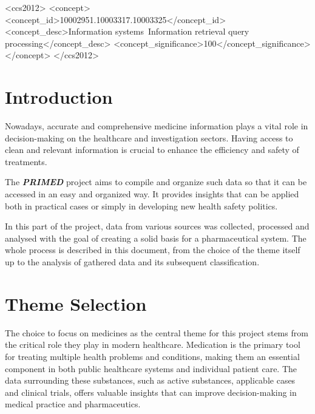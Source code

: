 \documentclass[sigconf]{acmart}
\begin{document}
\begin{CCSXML}
<ccs2012>
   <concept>
       <concept_id>10002951.10003317.10003325</concept_id>
       <concept_desc>Information systems~Information retrieval query processing</concept_desc>
       <concept_significance>100</concept_significance>
       </concept>
 </ccs2012>
\end{CCSXML}



\maketitle

\section{Introduction}
Nowadays, accurate and comprehensive medicine information plays a vital role in decision-making on the healthcare and investigation sectors. Having access to clean and relevant information is crucial to enhance the efficiency and safety of treatments.

The \textit{\textbf{PRIMED}} project aims to compile and organize such data so that it can be accessed in an easy and organized way. It provides insights that can be applied both in practical cases or simply in developing new health safety politics.

In this part of the project, data from various sources was collected, processed and analysed with the goal of creating a solid basis for a pharmaceutical system. The whole process is described in this document, from the choice of the theme itself up to the analysis of gathered data and its subsequent classification.

\section{Theme Selection}
The choice to focus on medicines as the central theme for this project stems from the critical role they play in modern healthcare. Medication is the primary tool for treating multiple health problems and conditions, making them an essential component in both public healthcare systems and individual patient care. The data surrounding these substances, such as active substances, applicable cases and clinical trials, offers valuable insights that can improve decision-making in medical practice and pharmaceutics.
\end{document}
